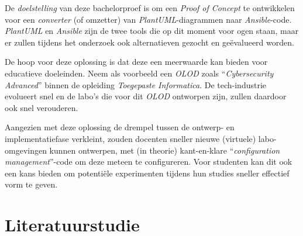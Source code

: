 De \emph{doelstelling} van deze bachelorproef is om een \emph{Proof of Concept} te ontwikkelen voor een \emph{converter} (of omzetter) van \emph{PlantUML}-diagrammen naar \emph{Ansible}-code. \emph{PlantUML} en \emph{Ansible} zijn de twee tools die op dit moment voor ogen staan, maar er zullen tijdens het onderzoek ook alternatieven gezocht en geëvalueerd worden.

De hoop voor deze oplossing is dat deze een meerwaarde kan bieden voor educatieve doeleinden. Neem als voorbeeld een \emph{OLOD} zoals ``\emph{Cybersecurity Advanced}'' binnen de opleiding \emph{Toegepaste Informatica}. De tech-industrie evolueert snel en de labo's die voor dit \emph{OLOD} ontworpen zijn, zullen daardoor ook snel verouderen.

Aangezien met deze oplossing de drempel tussen de ontwerp- en implementatiefase verkleint, zouden docenten sneller nieuwe (virtuele) labo-omgevingen kunnen ontwerpen, met (in theorie) kant-en-klare ``\emph{configuration management}''-code om deze meteen te configureren. Voor studenten kan dit ook een kans bieden om potentiële experimenten tijdens hun studies sneller effectief vorm te geven.


\section{Literatuurstudie}%
\label{sec:voorstel_literatuurstudie}





